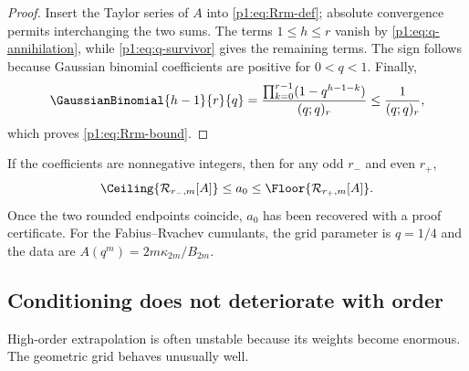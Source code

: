 \documentclass[11pt,oneside]{article}
\numberwithin{equation}{section}
\theoremstyle{definition}
\theoremstyle{remark}
\begin{document}
\begin{proof}
Insert the Taylor series of $A$ into \eqref{p1:eq:Rrm-def}; absolute convergence permits
interchanging the two sums.  The terms $1\le h\le r$ vanish by
\eqref{p1:eq:q-annihilation}, while \eqref{p1:eq:q-survivor} gives the remaining terms.
The sign follows because Gaussian binomial coefficients are positive for $0<q<1$.
Finally,
\[
 \GaussianBinomial{h-1}{r}{q}
 =\frac{\prod_{k=0}^{r-1}(1-q^{h-1-k})}{(q;q)_r}
 \le\frac1{(q;q)_r},
\]
which proves \eqref{p1:eq:Rrm-bound}.
\end{proof}

\begin{corollary}
\label{p1:cor:integer-brackets}
If the coefficients are nonnegative integers, then for any odd $r_-$ and even $r_+$,
\begin{equation}
 \Ceiling{\mathcal R_{r_-,m}[A]}
 \le a_0\le
 \Floor{\mathcal R_{r_+,m}[A]}.
 \label{p1:eq:integer-brackets}
\end{equation}
Once the two rounded endpoints coincide, $a_0$ has been recovered with a proof certificate.
For the Fabius--Rvachev cumulants, the grid parameter is $q=1/4$ and the data are
$A(q^m)=2m\kappa_{2m}/B_{2m}$.
\end{corollary}

\subsection{Conditioning does not deteriorate with order}

High-order extrapolation is often unstable because its weights become enormous.  The
geometric grid behaves unusually well.
\end{document}
